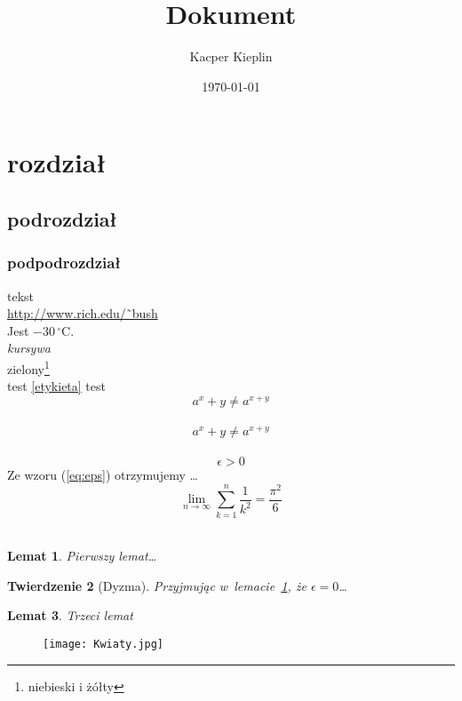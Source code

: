 \documentclass[a4paper,11pt]{article}
\title{Dokument}
\author{Kacper Kieplin}
\date{ \today}
\newtheorem{twr}{Twierdzenie}
\newtheorem{lem}[twr]{Lemat}
\begin{document}
\maketitle
\begin{center}
\tableofcontents
\end{center}

\section{rozdział}
\subsection{podrozdział}
\subsubsection{podpodrozdział} 

tekst\\
\url{http://www.rich.edu/˜bush}\\
Jest $-30\,^{\circ}\mathrm{C}$.\\
\emph{kursywa}\\
zielony\footnote{niebieski i żółty}\\

\label{etykieta}
test
\ref{etykieta}
test
\pageref{etykieta}\\

\begin{displaymath}
a^x+y \neq a^{x+y}
\end{displaymath}\\

\begin{equation}
a^x+y \neq a^{x+y}
\end{equation}\\

\begin{equation}
\epsilon > 0 \label{eq:eps}
\end{equation}
Ze wzoru (\ref{eq:eps})
otrzymujemy \ldots\\

\begin{displaymath}
\lim_{n \to \infty}
\sum_{k=1}^n \frac{1}{k^2}
= \frac{\pi^2}{6}
\end{displaymath}\\


\begin{lem} Pierwszy
lemat\dots\label{lem:1} \end{lem}
\begin{twr}[Dyzma]
Przyjmując w~lemacie~\ref{lem:1},
że $\epsilon=0$\dots \end{twr}
\begin{lem}Trzeci lemat\end{lem}

\begin{figure}
\centering
\texttt{[image: Kwiaty.jpg]}
\end{figure}
\end{document}
